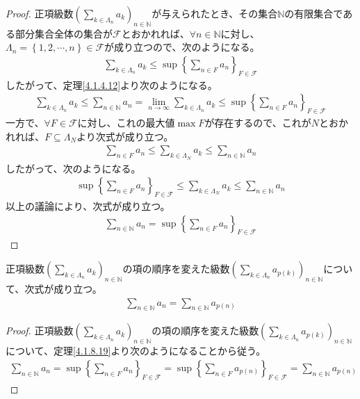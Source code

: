 \documentclass[dvipdfmx]{jsarticle}
\begin{document}
\begin{proof}
正項級数$\left( \sum_{k \in \varLambda_{n}} a_{k} \right)_{n \in \mathbb{N}}$が与えられたとき、その集合$\mathbb{N}$の有限集合である部分集合全体の集合が$\mathcal{F}$とおかれれば、$\forall n \in \mathbb{N}$に対し、$\varLambda_{n} = \left\{ 1,2,\cdots,n \right\}\in \mathcal{F}$が成り立つので、次のようになる。
\begin{align*}
\sum_{k \in \varLambda_{n}} a_{k} \leq \sup\left\{ \sum_{n \in F} a_{n} \right\}_{F\in \mathcal{F}}
\end{align*}
したがって、定理\ref{4.1.4.12}より次のようになる。
\begin{align*}
\sum_{k \in \varLambda_{n}} a_{k} \leq \sum_{n \in \mathbb{N}} a_{n} = \lim_{n \rightarrow \infty}{\sum_{k \in \varLambda_{n}} a_{k}} \leq \sup\left\{ \sum_{n \in F} a_{n} \right\}_{F\in \mathcal{F}}
\end{align*}
一方で、$\forall F\in \mathcal{F}$に対し、これの最大値$\max F$が存在するので、これが$N$とおかれれば、$F \subseteq \varLambda_{N}$より次式が成り立つ。
\begin{align*}
\sum_{n \in F} a_{n} \leq \sum_{k \in \varLambda_{N}} a_{k} \leq \sum_{n \in \mathbb{N}} a_{n}
\end{align*}
したがって、次のようになる。
\begin{align*}
\sup\left\{ \sum_{n \in F} a_{n} \right\}_{F\in \mathcal{F}} \leq \sum_{k \in \varLambda_{N}} a_{k} \leq \sum_{n \in \mathbb{N}} a_{n}
\end{align*}
以上の議論により、次式が成り立つ。
\begin{align*}
\sum_{n \in \mathbb{N}} a_{n} = \sup\left\{ \sum_{n \in F} a_{n} \right\}_{F\in \mathcal{F}}
\end{align*}
\end{proof}
\begin{thm}\label{4.1.8.20}
正項級数$\left( \sum_{k \in \varLambda_{n}} a_{k} \right)_{n \in \mathbb{N}}$の項の順序を変えた級数$\left( \sum_{k \in \varLambda_{n}} a_{p(k)} \right)_{n \in \mathbb{N}}$について、次式が成り立つ。
\begin{align*}
\sum_{n \in \mathbb{N}} a_{n} = \sum_{n \in \mathbb{N}} a_{p(n)}
\end{align*}
\end{thm}
\begin{proof}
正項級数$\left( \sum_{k \in \varLambda_{n}} a_{k} \right)_{n \in \mathbb{N}}$の項の順序を変えた級数$\left( \sum_{k \in \varLambda_{n}} a_{p(k)} \right)_{n \in \mathbb{N}}$について、定理\ref{4.1.8.19}より次のようになることから従う。
\begin{align*}
\sum_{n \in \mathbb{N}} a_{n} = \sup\left\{ \sum_{n \in F} a_{n} \right\}_{F\in \mathcal{F}} = \sup\left\{ \sum_{n \in F} a_{p(n)} \right\}_{F\in \mathcal{F}} = \sum_{n \in \mathbb{N}} a_{p(n)}
\end{align*}
\end{proof}\par
\end{document}
